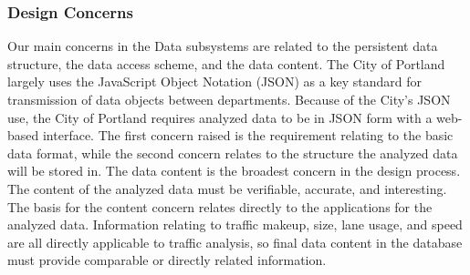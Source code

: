 \documentclass[onecolumn, draftclsnofoot,10pt, compsoc]{IEEEtran}
\begin{document}
\subsubsection{Design Concerns}
Our main concerns in the Data subsystems are related to the persistent data structure, the data access scheme, and the data content. The City of Portland largely uses the JavaScript Object Notation (JSON) as  a key standard for transmission of data objects between departments. Because of the City's JSON use, the City of Portland requires analyzed data to be in JSON form with a web-based interface. The first concern raised is the requirement relating to the basic data format, while the second concern relates to the structure the analyzed data will be stored in. The data content is the broadest concern in the design process. The content of the analyzed data must be verifiable, accurate, and interesting. The basis for the content concern relates directly to the applications for the analyzed data. Information relating to traffic makeup, size, lane usage, and speed are all directly applicable to traffic analysis, so final data content in the database must provide comparable or directly related information.
\end{document}
